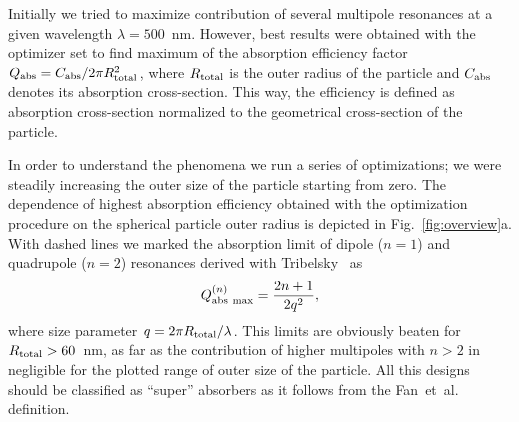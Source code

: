 \documentclass[aps,prl,twocolumn,showpacs,superscriptaddress,groupedaddress]{revtex4-1}
\begin{document}
Initially we tried to maximize contribution of several multipole
resonances at a given wavelength $\lambda=500$~nm.  However, best
results were obtained with the optimizer set to find maximum of the
absorption efficiency factor $Q_{\rm abs}=C_{\rm abs}/2\pi R_{\rm
  total}^2$, where $R_{\rm total}$ is the outer radius of the particle
and $C_{\rm abs}$ denotes its absorption cross-section.  This way, the
efficiency is defined as absorption cross-section normalized to the
geometrical cross-section of the particle. 

\begin{figure}
\end{figure}
In order to understand the phenomena we run a series of optimizations;
we were steadily increasing the outer size of the particle starting
from zero.  The dependence of highest absorption efficiency obtained
with the optimization procedure on the spherical particle outer radius
is depicted in Fig.~\ref{fig:overview}a.  With dashed lines we marked
the absorption limit of dipole ($n=1$) and quadrupole ($n=2$) resonances
derived with Tribelsky~\cite{Tribelsky-2011} as $$Q^{(n)}_{\rm abs\
  max}=\frac{2n+1}{2q^2},$$ where size parameter $q=2\pi R_{\rm
  total}/\lambda$.  This limits are obviously beaten for $R_{\rm
  total}>60$~nm, as far as the contribution of higher multipoles with
$n>2$ in negligible for the plotted range of outer size of the
particle.  All this designs should be classified as ``super''
absorbers as it follows from the Fan~et~al.~\cite{Fan-2010,Fan-2011}
definition.
\end{document}
